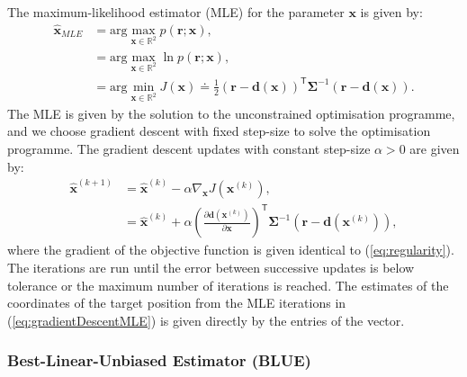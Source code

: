 \documentclass[11pt]{article}
\newcommand{\br}{\mathbf{r}}
\newcommand{\bd}{\mathbf{d}}
\newcommand{\bx}{\mathbf{x}}
\newcommand{\rr}{\mathbb{R}}
\newcommand{\TT}{\mathsf{T}}
\newcommand{\bSigma}{\boldsymbol{\Sigma}}
\begin{document}
The maximum-likelihood estimator (MLE) for the parameter $\bx$ is given by:
\begin{equation}
\begin{split}
	\hat{\bx}_{MLE} &= \mathrm{arg }\max_{\bx \in \rr^{2}} p(\br ; \bx), \\
	&= \mathrm{arg }\max_{\bx \in \rr^{2}} \ln p(\br ; \bx), \\
	&= \mathrm{arg }\min_{\bx \in \rr^{2}} J(\bx) \doteq \frac{1}{2} (\br - \bd(\bx))^{\TT} \bSigma^{-1} (\br - \bd(\bx)).
\end{split}
\label{eq:mle}
\end{equation}
The MLE is given by the solution to the unconstrained optimisation programme, and we choose gradient descent with fixed step-size to solve the optimisation programme. The gradient descent updates with constant step-size $\alpha > 0$ are given by:
\begin{equation}
\begin{split}
	\hat{\bx}^{(k+1)} &= \hat{\bx}^{(k)} - \alpha \nabla_{\bx} J(\bx^{(k)}), \\
	&= \hat{\bx}^{(k)} + \alpha \left( \frac{\partial \bd(\bx^{(k)})}{\partial \bx} \right)^{\TT} \bSigma^{-1} \left( \br - \bd(\bx^{(k)}) \right),
\end{split}
\label{eq:gradientDescentMLE}
\end{equation}
where the gradient of the objective function is given identical to (\ref{eq:regularity}). The iterations are run until the error between successive updates is below tolerance or the maximum number of iterations is reached. The estimates of the coordinates of the target position from the MLE iterations in (\ref{eq:gradientDescentMLE}) is given directly by the entries of the vector.


\subsubsection*{Best-Linear-Unbiased Estimator (BLUE)}
\label{subsubsec:blue}
\end{document}
